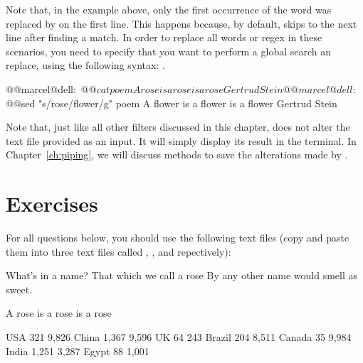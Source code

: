 Note that, in the example above, only the first occurrence of the word  was replaced by  on the first line. This happens because, by default,  skips to the next line after finding a match. In order to replace all words or \acs{regex} in these scenarios, you need to specify that you want to perform a global search an replace, using the following syntax: .

\begin{command_line}[make]
@@marcel@dell:~$ @@cat poem
A rose is a rose is a rose
Gertrud Stein
@@marcel@dell:~$ @@sed "s/rose/flower/g" poem
A flower is a flower is a flower
Gertrud Stein
\end{command_line}

Note that, just like all other filters discussed in this chapter,  does not alter the text file provided as an input. It will simply display its result in the terminal. In Chapter~\ref{ch:piping}, we will discuss methods to save the alterations made by .

\section*{Exercises}

For all questions below, you should use the following text files (copy and paste them into three text files called ,  , and  repectively):

\begin{command_line}[make]
What's in a name? That which we call a rose
By any other name would smell as sweet.
\end{command_line}

\begin{command_line}[Bash]
A rose is a rose is a rose
\end{command_line}

\begin{command_line}[Bash]
USA     321     9,826
China   1,367   9,596
UK      64      243
Brazil  204     8,511
Canada  35      9,984
India   1,251   3,287
Egypt   88      1,001
\end{command_line}

